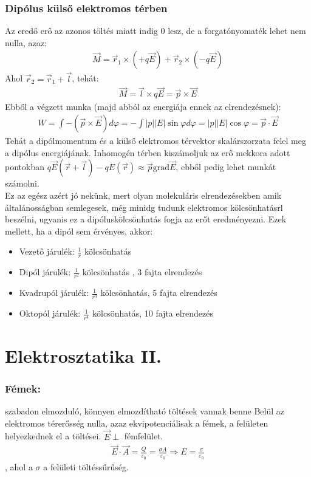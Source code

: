 \documentclass{article}
\begin{document}
\subsubsection{Dipólus külső elektromos térben}
Az eredő erő az azonos töltés miatt indig 0 lesz, de a forgatónyomaték lehet nem nulla, azaz:
\begin{gather*}
\vec{M} = \vec{r}_1 \times (+q\vec{E}) + \vec{r}_2 \times (-q\vec{E})
\end{gather*}
Ahol $\vec{r}_2 = \vec{r}_1+ \vec{l}$, tehát:
\begin{gather*}
\vec{M} = \vec{l} \times q\vec{E} = \vec{p} \times \vec{E}
\end{gather*}
Ebből a végzett munka (majd abból az energiája ennek az elrendezésnek):
\begin{gather*}
W=\int - (\vec{p} \times \vec{E}) d\varphi = -\int|p||E|\sin \varphi d\varphi = |p||E|\cos \varphi = \vec{p} \cdot \vec{E} 
\end{gather*}
Tehát a dipólmomentum és a külső elektromos térvektor skalárszorzata felel meg a dipólus energiájának.
Inhomogén térben kiszámoljuk az erő mekkora adott pontokban $q\vec{E}(\vec{r}+\vec{l})-qE(\vec{r}) \approx \vec{p} \mathrm{grad} \vec{E}$, ebből pedig lehet munkát számolni. \\
Ez az egész azért jó nekünk, mert olyan molekuláris elrendezésekben amik általánosságban semlegesek, még minidg tudunk elektromos kölcsönhatásrl beszélni, ugyanis ez a dipóluskölcsönhatás fogja az erőt eredményezni. Ezek mellett, ha a dipól sem érvényes, akkor:
\begin{itemize}
\item Vezető járulék: $\frac{1}{r}$ kölcsönhatás \\
\item Dipól járulék: $\frac{1}{r^2}$ kölcsönhatás , 3 fajta elrendezés\\
\item Kvadrupól járulék: $\frac{1}{r^3}$ kölcsönhatás, 5 fajta elrendezés \\
\item Oktopól járulék: $\frac{1}{r^4}$ kölcsönhatás, 10 fajta elrendezés
\end{itemize}
\newpage	
\section{Elektrosztatika II.}
\subsubsection{Fémek:}
szabadon elmozduló, könnyen elmozdítható töltések vannak benne
Belül az elektromos térerősség nulla, azaz ekvipotenciálisak a fémek, a felületen helyezkednek el a töltései. $\vec{E} \perp $ 
fémfelület. 
\begin{gather*}
\vec{E} \cdot \vec{A} = \frac{Q}{\varepsilon_0} = \frac{\sigma A}{\varepsilon_0} \Rightarrow E = \frac{\sigma}{\varepsilon_0}
\end{gather*}
, ahol a $\sigma$ a felületi töltéssűrűség. 
\end{document}
